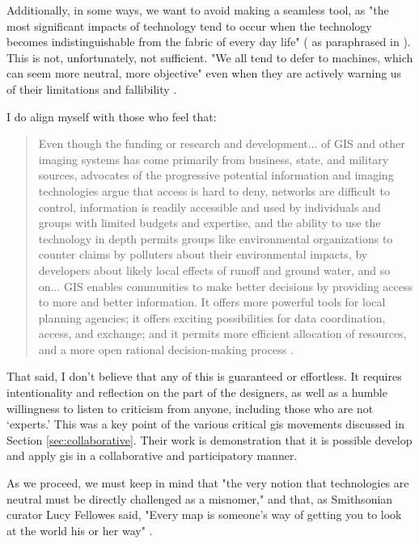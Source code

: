 Additionally, in some ways, we want to avoid making a seamless tool, as "the most significant impacts of technology tend to occur when the technology becomes indistinguishable from the fabric of every day life" (\cite{weinerComputer21stCentury1991} as paraphrased in \cite{vereginComputerInnovationAdoption1994}). This is not, unfortunately, not sufficient. "We all tend to defer to machines, which can seem more neutral, more objective" even when they are actively warning us of their limitations and fallibility \cite{eubanksAutomatingInequalityHow2018}.

I do align myself with those who feel that:

\blockquote{Even though the funding or research and development... of GIS and other imaging systems has come primarily from business, state, and military sources, advocates of the progressive potential information and imaging technologies argue that access is hard to deny, networks are difficult to control, information is readily accessible and used by individuals and groups with limited budgets and expertise, and the ability to use the technology in depth permits groups like environmental organizations to counter claims by polluters about their environmental impacts, by developers about likely local effects of runoff and ground water, and so on... GIS enables communities to make better decisions by providing access to more and better information. It offers more powerful tools for local planning agencies; it offers exciting possibilities for data coordination, access, and exchange; and it permits more efficient allocation of resources, and a more open rational decision-making process \cite{picklesRepresentationsElectronicAge1994}.} 

That said, I don't believe that any of this is guaranteed or effortless. It requires intentionality and reflection on the part of the designers, as well as a humble willingness to listen to criticism from anyone, including those who are not `experts.' This was a key point of the various critical \ac{gis} movements discussed in Section \ref{sec:collaborative}. Their work is demonstration that it is possible develop and apply \ac{gis} in a collaborative and participatory manner.

As we proceed, we must keep in mind that "the very notion that technologies are neutral must be directly challenged as a misnomer," \cite{nobleAlgorithmsOppressionHow2018} and that, as Smithsonian curator Lucy Fellowes said, "Every map is someone's way of getting you to look at the world his or her way" \cite{henriksonPowerPoliticsMaps1994}. 

